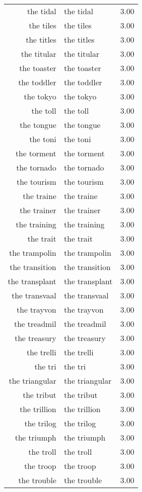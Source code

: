 \begin{table}[ht]
\begin{tabular}{rlr}
  the tidal & the tidal & 3.00 \\ 
  the tiles & the tiles & 3.00 \\ 
  the titles & the titles & 3.00 \\ 
  the titular & the titular & 3.00 \\ 
  the toaster & the toaster & 3.00 \\ 
  the toddler & the toddler & 3.00 \\ 
  the tokyo & the tokyo & 3.00 \\ 
  the toll & the toll & 3.00 \\ 
  the tongue & the tongue & 3.00 \\ 
  the toni & the toni & 3.00 \\ 
  the torment & the torment & 3.00 \\ 
  the tornado & the tornado & 3.00 \\ 
  the tourism & the tourism & 3.00 \\ 
  the traine & the traine & 3.00 \\ 
  the trainer & the trainer & 3.00 \\ 
  the training & the training & 3.00 \\ 
  the trait & the trait & 3.00 \\ 
  the trampolin & the trampolin & 3.00 \\ 
  the transition & the transition & 3.00 \\ 
  the transplant & the transplant & 3.00 \\ 
  the transvaal & the transvaal & 3.00 \\ 
  the trayvon & the trayvon & 3.00 \\ 
  the treadmil & the treadmil & 3.00 \\ 
  the treasury & the treasury & 3.00 \\ 
  the trelli & the trelli & 3.00 \\ 
  the tri & the tri & 3.00 \\ 
  the triangular & the triangular & 3.00 \\ 
  the tribut & the tribut & 3.00 \\ 
  the trillion & the trillion & 3.00 \\ 
  the trilog & the trilog & 3.00 \\ 
  the triumph & the triumph & 3.00 \\ 
  the troll & the troll & 3.00 \\ 
  the troop & the troop & 3.00 \\ 
  the trouble & the trouble & 3.00 \\ 

\end{tabular}
\end{table}
